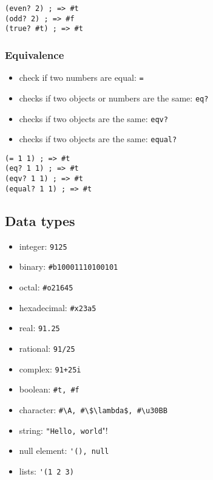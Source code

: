 \documentclass[a4paper,landscape,10pt]{article}
\begin{document}
\begin{multicols*}{2}
  \begin{lstlisting}[language=Racket]
(even? 2) ; => #t
(odd? 2) ; => #f
(true? #t) ; => #t
\end{lstlisting}

  \switchcolumn

  \subsubsection{Equivalence}

  \begin{itemize}
    \item check if two numbers are equal: \lstinline[language=Racket]!=!
    \item checks if two objects or numbers are the same: \lstinline[language=Racket]!eq?!
    \item checks if two objects are the same: \lstinline[language=Racket]!eqv?!
    \item checks if two objects are the same: \lstinline[language=Racket]!equal?!
  \end{itemize}

  \begin{lstlisting}[language=Racket]
(= 1 1) ; => #t
(eq? 1 1) ; => #t
(eqv? 1 1) ; => #t
(equal? 1 1) ; => #t
\end{lstlisting}

  \subsection{Data types}

  \begin{itemize}
    \item integer: \lstinline[language=Racket]!9125!
    \item binary: \lstinline[language=Racket]!#b10001110100101!
    \item octal: \lstinline[language=Racket]!#o21645!
    \item hexadecimal: \lstinline[language=Racket]!#x23a5!
    \item real: \lstinline[language=Racket]!91.25!
    \item rational: \lstinline[language=Racket]!91/25!
    \item complex: \lstinline[language=Racket]!91+25i!
    \item boolean: \lstinline[language=Racket]!#t, #f!
    \item character: \lstinline[language=Racket]!#\A, #\$\lambda$, #\u30BB!
    \item string: \lstinline[language=Racket]!"Hello, world!"!
    \item null element: \lstinline[language=Racket]!'(), null!
    \item lists: \lstinline[language=Racket]!'(1 2 3)!
  \end{itemize}


\end{multicols*}
\end{document}
